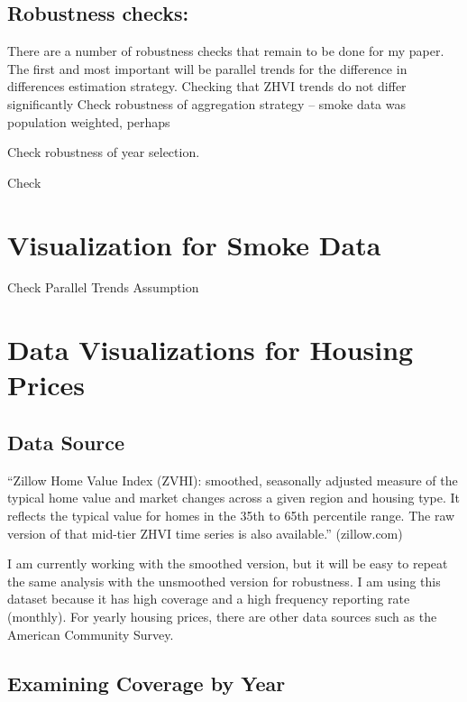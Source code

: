 \documentclass[]{article}
\begin{document}
\subsection{Robustness checks:}\label{robustness-checks}

There are a number of robustness checks that remain to be done for my
paper. The first and most important will be parallel trends for the
difference in differences estimation strategy. Checking that ZHVI trends
do not differ significantly Check robustness of aggregation strategy --
smoke data was population weighted, perhaps

Check robustness of year selection.

Check

\section{Visualization for Smoke
Data}\label{visualization-for-smoke-data}

Check Parallel Trends Assumption

\section{Data Visualizations for Housing
Prices}\label{data-visualizations-for-housing-prices}

\subsection{Data Source}\label{data-source}

``Zillow Home Value Index (ZVHI): smoothed, seasonally adjusted measure
of the typical home value and market changes across a given region and
housing type. It reflects the typical value for homes in the 35th to
65th percentile range. The raw version of that mid-tier ZHVI time series
is also available.'' (zillow.com)

I am currently working with the smoothed version, but it will be easy to
repeat the same analysis with the unsmoothed version for robustness. I
am using this dataset because it has high coverage and a high frequency
reporting rate (monthly). For yearly housing prices, there are other
data sources such as the American Community Survey.

\pagebreak

\subsection{Examining Coverage by
Year}\label{examining-coverage-by-year}
\end{document}
